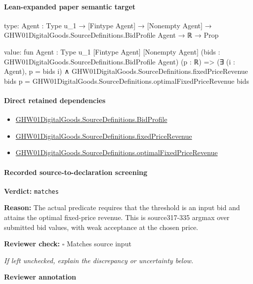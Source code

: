 \documentclass[10pt]{article}
\newcommand{\reviewerbox}{%
  \par\noindent\fbox{\parbox{0.96\linewidth}{\rule{0pt}{0.38in}}}\par
}
\newcommand{\reviewmatch}[1]{%
  \par\noindent\textbf{Reviewer check:} $\square$\; #1\par
  \noindent\emph{If left unchecked, explain the discrepancy or uncertainty below.}\par
}
\begin{document}
\paragraph{Lean-expanded paper semantic target}
\begin{ReviewVerbatim}
type:
{Agent : Type u_1} →
  [Fintype Agent] → [Nonempty Agent] → GHW01DigitalGoods.SourceDefinitions.BidProfile Agent → ℝ → Prop

value:
fun {Agent : Type u_1} [Fintype Agent] [Nonempty Agent] (bids : GHW01DigitalGoods.SourceDefinitions.BidProfile Agent)
    (p : ℝ) =>
  (∃ (i : Agent), p = bids i) ∧
    GHW01DigitalGoods.SourceDefinitions.fixedPriceRevenue bids p =
      GHW01DigitalGoods.SourceDefinitions.optimalFixedPriceRevenue bids
\end{ReviewVerbatim}

\paragraph{Direct retained dependencies}
\begin{itemize}\raggedright
\item \hyperlink{paper-prerequisite-ac8769d0dccf04f4}{GHW01\allowbreak{}Digital\allowbreak{}Goods.\allowbreak{}Source\allowbreak{}Definitions.\allowbreak{}Bid\allowbreak{}Profile}
\item \hyperlink{paper-prerequisite-ae58224244d139f8}{GHW01\allowbreak{}Digital\allowbreak{}Goods.\allowbreak{}Source\allowbreak{}Definitions.\allowbreak{}fixed\allowbreak{}Price\allowbreak{}Revenue}
\item \hyperlink{paper-prerequisite-4fcd7524a5594ff6}{GHW01\allowbreak{}Digital\allowbreak{}Goods.\allowbreak{}Source\allowbreak{}Definitions.\allowbreak{}optimal\allowbreak{}Fixed\allowbreak{}Price\allowbreak{}Revenue}
\end{itemize}
\paragraph{Recorded source-to-declaration screening}
\textbf{Verdict:} \texttt{matches}
\\
{\raggedright
\textbf{Reason:} The actual predicate requires that the threshold is an input bid and attains the optimal fixed-\allowbreak{}price revenue.\allowbreak{} This is source317-\allowbreak{}335 argmax over submitted bid values, with weak acceptance at the chosen price.\allowbreak{}
\par}
\reviewmatch{Matches source input}
\noindent\textbf{Reviewer annotation}\par
\reviewerbox
\clearpage
\hypertarget{paper-prerequisite-b3300c5b0b93fbe9}{}
\end{document}
